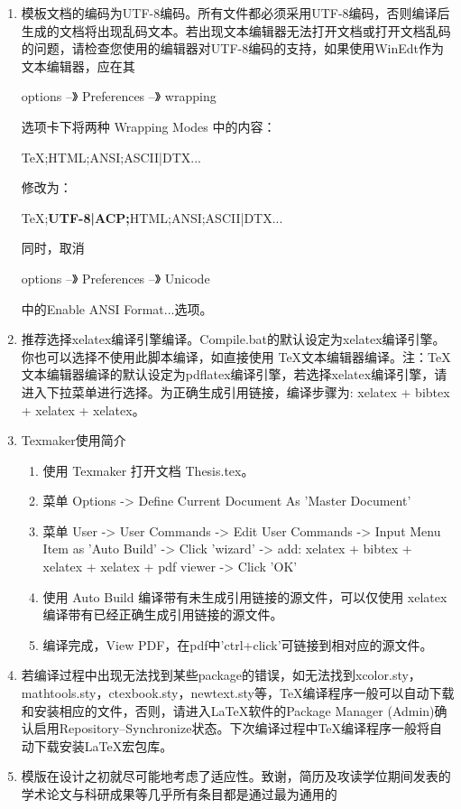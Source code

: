 \begin{enumerate}
  \item 模板文档的编码为UTF-8编码。所有文件都必须采用UTF-8编码，否则编译后生成的文档将出现乱码文本。若出现文本编辑器无法打开文档或打开文档乱码的问题，请检查您使用的编辑器对UTF-8编码的支持，如果使用WinEdt作为文本编辑器，应在其

  options --》 Preferences --》 wrapping

  选项卡下将两种 Wrapping Modes 中的内容：

  TeX;HTML;ANSI;ASCII|DTX...

  修改为：

  TeX;\textbf{UTF-8|ACP;}HTML;ANSI;ASCII|DTX...

  同时，取消

  options --》 Preferences --》 Unicode

  中的Enable ANSI Format...选项。
  \item 推荐选择xelatex编译引擎编译。Compile.bat的默认设定为xelatex编译引擎。你也可以选择不使用此脚本编译，如直接使用 \TeX{}文本编辑器编译。注：\TeX{}文本编辑器编译的默认设定为pdflatex编译引擎，若选择xelatex编译引擎，请进入下拉菜单进行选择。为正确生成引用链接，编译步骤为: xelatex + bibtex + xelatex + xelatex。
  \item Texmaker使用简介
      \begin{enumerate}
          \item 使用 Texmaker 打开文档 Thesis.tex。
          \item 菜单 Options -> Define Current Document As 'Master Document'
          \item 菜单 User -> User Commands -> Edit User Commands -> Input Menu Item as 'Auto Build' -> Click 'wizard' -> add: xelatex + bibtex + xelatex + xelatex + pdf viewer -> Click 'OK'
          \item 使用 Auto Build 编译带有未生成引用链接的源文件，可以仅使用 xelatex 编译带有已经正确生成引用链接的源文件。
          \item 编译完成，View PDF，在pdf中'ctrl+click'可链接到相对应的源文件。
      \end{enumerate}
  \item 若编译过程中出现无法找到某些package的错误，如无法找到xcolor.sty，mathtools.sty，ctexbook.sty，newtext.sty等，\TeX{}编译程序一般可以自动下载和安装相应的文件，否则，请进入\LaTeX{}软件的Package Manager (Admin)确认启用Repository--Synchronize状态。下次编译过程中\TeX{}编译程序一般将自动下载安装\LaTeX{}宏包库。
  \item 模版在设计之初就尽可能地考虑了适应性。致谢，简历及攻读学位期间发表的学术论文与科研成果等几乎所有条目都是通过最为通用的
       

\end{enumerate}
